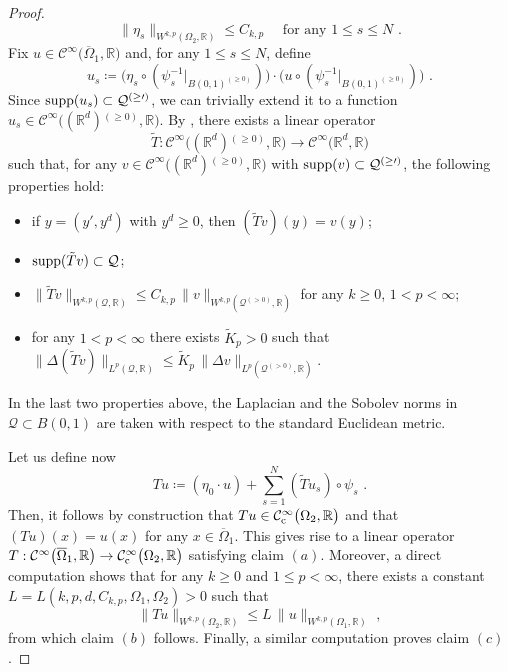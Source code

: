\documentclass[10pt, a4paper, reqno, oneside]{amsart}
\newcommand\bcdot{\ensuremath{
  \mathchoice
   {\mskip\thinmuskip\lower0.2ex\hbox{\scalebox{1.6}{$\cdot$}}\mskip\thinmuskip}}
   {\mskip\thinmuskip\lower0.2ex\hbox{\scalebox{1.6}{$\cdot$}}\mskip\thinmuskip}
   {\lower0.3ex\hbox{\scalebox{1.2}{$\cdot$}}}
   {\lower0.3ex\hbox{\scalebox{1.2}{$\cdot$}}}
}
\theoremstyle{plain}
\theoremstyle{definition}
\theoremstyle{plain}
\theoremstyle{definition}
\theoremstyle{plain}
\renewcommand{\=}{:=}
\begin{document}
\begin{proof}
$$
\|\eta_s\|_{W^{k,p}(\Omega_2,\mathbb{R})} \leq C_{k,p} \quad \text{ for any } 1 \leq s \leq N \,\, .
$$
Fix $u \in \mathcal{C}^{\infty}\big(\overline{\Omega}_1,\mathbb{R}\big)$ and, for any $1 \leq s \leq N$, define
$$
u_s \coloneqq \big(\eta_s \circ (\psi_s^{-1}|_{B(0,1)^{(\geq0)}})\big) \cdot \big(u \circ (\psi_s^{-1}|_{B(0,1)^{(\geq0)}})\big) \,\, .$$
Since ${\rm supp}(u_s) \subset \mathcal{Q^{(\geq0)}}$, we can trivially extend it to a function $u_s \in \mathcal{C}^{\infty}\big((\mathbb{R}^d){}^{(\geq0)}, \mathbb{R}\big)$. By \cite[Thm 5.21]{AdamsF}, there exists a linear operator
$$
\tilde{T}: \mathcal{C}^{\infty}\big((\mathbb{R}^d){}^{(\geq0)}, \mathbb{R}\big) \to \mathcal{C}^{\infty}\big(\mathbb{R}^d,\mathbb{R}\big)
$$
such that, for any $v \in \mathcal{C}^{\infty}\big((\mathbb{R}^d){}^{(\geq0)}, \mathbb{R}\big)$ with ${\rm supp}(v) \subset \mathcal{Q^{(\geq0)}}$, the following properties hold: \begin{itemize}
\item[$\bcdot$] if $y=(y',y^d)$ with $y^d \geq 0$, then $(\tilde{T}v)(y) =v(y)$;
\item[$\bcdot$] ${\rm supp}(\tilde{T}v) \subset \mathcal{Q}$;
\item[$\bcdot$] $\| \tilde{T}v \|_{W^{k,p}(\mathcal{Q},\mathbb{R})} \leq C_{k,p} \, \| v \|_{W^{k,p}(\mathcal{Q}^{(>0)},\mathbb{R})}$ for any $k \geq 0$, $1 < p < \infty$;
\item[$\bcdot$] for any $1 < p <\infty$ there exists $\tilde{K}_p>0$ such that $\|\Delta (\tilde{T}v)\|_{L^p(\mathcal{Q},\mathbb{R})} \leq \tilde{K}_p \, \|\Delta v\|_{L^p(\mathcal{Q}^{(>0)},\mathbb{R})}$.
\end{itemize}
In the last two properties above, the Laplacian and the Sobolev norms in $ \mathcal{Q} \subset B(0,1)$ are taken with respect to the standard Euclidean metric.

Let us define now
$$
Tu \coloneqq (\eta_0 \cdot u) + \sum_{s=1}^N (\tilde{T}u_s) \circ \psi_s \,\, .
$$
Then, it follows by construction that $Tu \in \mathcal{C}^{\infty}_{\rm c}\big(\Omega_2,\mathbb{R}\big)$ and that $(Tu)(x)=u(x)$ for any $x \in \overline{\Omega}_1$. This gives rise to a linear operator $T: \mathcal{C}^{\infty}\big(\overline{\Omega}_1,\mathbb{R}\big) \to \mathcal{C}^{\infty}_{\rm c}\big(\Omega_2,\mathbb{R}\big)$ satisfying claim $(a)$. Moreover, a direct computation shows that for any $k \geq 0$ and $1 \leq p < \infty$, there exists a constant $L=L(k,p,d,C_{k,p},\Omega_1,\Omega_2)>0$ such that
$$
\| Tu \|_{W^{k,p}(\Omega_2,\mathbb{R})} \leq L \, \| u \|_{W^{k,p}(\Omega_1,\mathbb{R})} \,\, ,
$$
from which claim $(b)$ follows. Finally, a similar computation proves claim $(c)$.
\end{proof}
\end{document}
